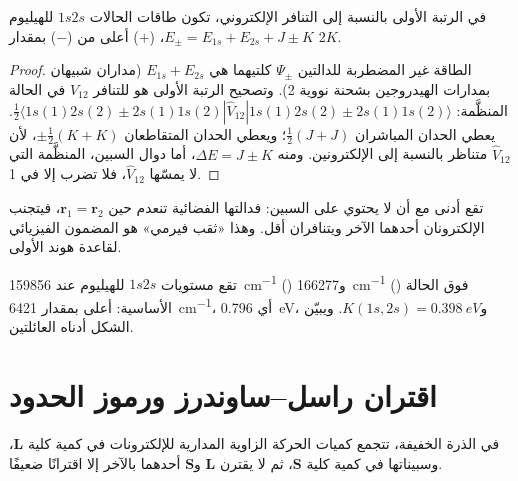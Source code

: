 \begin{proposition}\label{prop:b3:many-electron-atoms:helium}
في الرتبة الأولى بالنسبة إلى التنافر الإلكتروني، تكون طاقات الحالات $1s2s$ للهيليوم
$E_\pm = E_{1s} + E_{2s} + J \pm K$،  ($+$) أعلى من
 ($-$) بمقدار $2K$.
\end{proposition}

\begin{proof}
الطاقة غير المضطربة للدالتين $\Psi_\pm$ كلتيهما هي $E_{1s} + E_{2s}$ (مداران شبيهان
بمدارات الهيدروجين بشحنة نووية 2). وتصحيح الرتبة الأولى هو
 للتنافر $\hat V_{12}$ في الحالة المنظَّمة:
$\frac12\langle 1s(1)2s(2) \pm 2s(1)1s(2)|\hat V_{12}|1s(1)2s(2) \pm
2s(1)1s(2)\rangle$. يعطي الحدان المباشران $\frac12(J + J)$؛ ويعطي الحدان
المتقاطعان $\pm\frac12(K + K)$، لأن $\hat V_{12}$ متناظر بالنسبة إلى
الإلكترونين. ومنه $\Delta E = J \pm K$، أما دوال السبين، المنظَّمة
التي لا يمسّها $\hat V_{12}$، فلا تضرب إلا في 1.
\end{proof}

تقع  أدنى مع أن  لا يحتوي على السبين: فدالتها
الفضائية تنعدم حين $\mathbf r_1 = \mathbf r_2$، فيتجنب الإلكترونان
أحدهما الآخر ويتنافران أقل. وهذا «ثقب فيرمي» هو
المضمون الفيزيائي لقاعدة هوند الأولى.

\begin{example}\label{ex:b3:many-electron-atoms:K}
تقع مستويات $1s2s$ للهيليوم عند \qty{159856}{cm^{-1}} () 
و\qty{166277}{cm^{-1}} () فوق الحالة الأساسية:  أعلى بمقدار
\qty{6421}{cm^{-1}}، أي \qty{0.796}{eV}، و$K(1s,2s) = \qty{0.398}{eV}$.
ويبيّن الشكل أدناه العائلتين.
\end{example}

\section{اقتران راسل--ساوندرز ورموز الحدود}

في الذرة الخفيفة، تتجمع كميات الحركة الزاوية المدارية للإلكترونات في
كمية كلية $\mathbf L$، وسبيناتها في كمية كلية $\mathbf S$، ثم لا يقترن
$\mathbf L$ و$\mathbf S$ أحدهما بالآخر إلا اقترانًا ضعيفًا.

